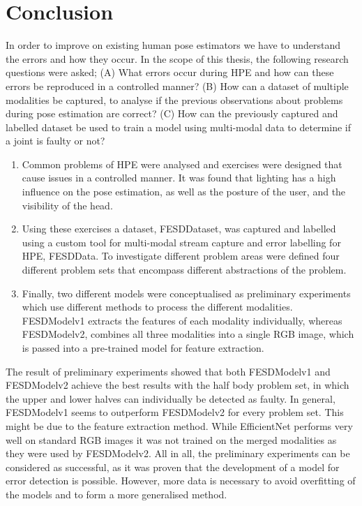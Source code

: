 \chapter{Conclusion}
\label{sec:conclusion}

In order to improve on existing human pose estimators we have to understand the errors and how they occur. In the scope of this thesis, the following research questions were asked; (A) What errors occur during HPE and how can these errors be reproduced in a controlled manner? (B) How can a dataset of multiple modalities be captured, to analyse if the previous observations about problems during pose estimation are correct? (C) How can the previously captured and labelled dataset be used to train a model using multi-modal data to determine if a joint is faulty or not? 

\begin{enumerate}[label=\Alph*]
  \item Common problems of HPE were analysed and exercises were designed that cause issues in a controlled manner. It was found that lighting has a high influence on the pose estimation, as well as the posture of the user, and the visibility of the head.
  \item Using these exercises a dataset, FESDDataset, was captured and labelled using a custom tool for multi-modal stream capture and error labelling for HPE, FESDData. To investigate different problem areas were defined four different problem sets that encompass different abstractions of the problem. 
  \item Finally, two different models were conceptualised as preliminary experiments which use different methods to process the different modalities. FESDModelv1 extracts the features of each modality individually, whereas FESDModelv2, combines all three modalities into a single RGB image, which is passed into a pre-trained model for feature extraction.
\end{enumerate}

The result of preliminary experiments showed that both FESDModelv1 and FESDModelv2 achieve the best results with the half body problem set, in which the upper and lower halves can individually be detected as faulty. In general, FESDModelv1 seems to outperform FESDModelv2 for every problem set. This might be due to the feature extraction method. While EfficientNet performs very well on standard RGB images it was not trained on the merged modalities as they were used by FESDModelv2. All in all, the preliminary experiments can be considered as successful, as it was proven that the development of a model for error detection is possible. However, more data is necessary to avoid overfitting of the models and to form a more generalised method. 

